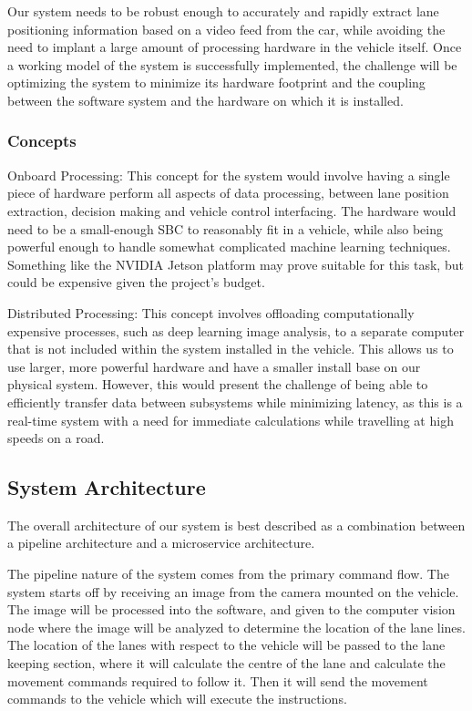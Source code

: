 \documentclass[titlepage,draft]{article}
\begin{document}
Our system needs to be robust enough to accurately and rapidly extract lane positioning information based on a video feed from the car, while avoiding the need to implant a large amount of processing hardware in the vehicle itself. Once a working model of the system is successfully implemented, the challenge will be optimizing the system to minimize its hardware footprint and the coupling between the software system and the hardware on which it is installed.

\subsubsection{Concepts}
Onboard Processing: This concept for the system would involve having a single piece of hardware perform all aspects of data processing, between lane position extraction, decision making and vehicle control interfacing. The hardware would need to be a small-enough SBC to reasonably fit in a vehicle, while also being powerful enough to handle somewhat complicated machine learning techniques. Something like the NVIDIA Jetson\cite{jetson_embeded_computing} platform may prove suitable for this task, but could be expensive given the project's budget.

Distributed Processing: This concept involves offloading computationally expensive processes, such as deep learning image analysis, to a separate computer that is not included within the system installed in the vehicle. This allows us to use larger, more powerful hardware and have a smaller install base on our physical system. However, this would present the challenge of being able to efficiently transfer data between subsystems while minimizing latency, as this is a real-time system with a need for immediate calculations while travelling at high speeds on a road.


\subsection{System Architecture}
The overall architecture of our system is best described as a combination between a pipeline architecture and a microservice architecture.

The pipeline nature of the system comes from the primary command flow. The system starts off by receiving an image from the camera mounted on the vehicle. The image will be processed into the software, and given to the computer vision node where the image will be analyzed to determine the location of the lane lines. The location of the lanes with respect to the vehicle will be passed to the lane keeping section, where it will calculate the centre of the lane and calculate the movement commands required to follow it. Then it will send the movement commands to the vehicle which will execute the instructions.
\end{document}
